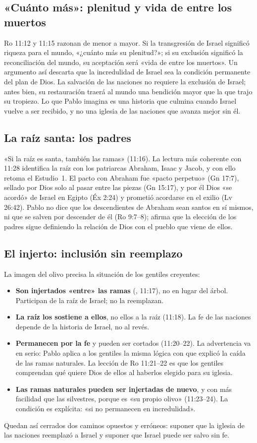 \subsection{«Cuánto más»: plenitud y vida de entre los muertos}
Ro 11:12 y 11:15 razonan de menor a mayor. Si la transgresión de Israel significó riqueza para el mundo, «¿cuánto más su plenitud?»; si su exclusión significó la reconciliación del mundo, su aceptación será «vida de entre los muertos». Un argumento así descarta que la incredulidad de Israel sea la condición permanente del plan de Dios. La salvación de las naciones no requiere la exclusión de Israel; antes bien, su restauración traerá al mundo una bendición mayor que la que trajo su tropiezo. Lo que Pablo imagina es una historia que culmina cuando Israel vuelve a ser recibido, y no una iglesia de las naciones que avanza mejor sin él.

\subsection{La raíz santa: los padres}
«Si la raíz es santa, también las ramas» (11:16). La lectura más coherente con 11:28 identifica la raíz con los patriarcas Abraham, Isaac y Jacob, y con ello retoma el Estudio~1. El pacto con Abraham fue «pacto perpetuo» (Gn 17:7), sellado por Dios solo al pasar entre las piezas (Gn 15:17), y por él Dios «se acordó» de Israel en Egipto (Éx 2:24) y prometió acordarse en el exilio (Lv 26:42). Pablo no dice que los descendientes de Abraham sean santos en sí mismos, ni que se salven por descender de él (Ro 9:7--8); afirma que la elección de los padres sigue definiendo la relación de Dios con el pueblo que viene de ellos.

\subsection{El injerto: inclusión sin reemplazo}
La imagen del olivo precisa la situación de los gentiles creyentes:
\begin{itemize}
\item \textbf{Son injertados «entre» las ramas} (, 11:17), no en lugar del árbol. Participan de la raíz de Israel; no la reemplazan.
\item \textbf{La raíz los sostiene a ellos}, no ellos a la raíz (11:18). La fe de las naciones depende de la historia de Israel, no al revés.
\item \textbf{Permanecen por la fe} y pueden ser cortados (11:20--22). La advertencia va en serio: Pablo aplica a los gentiles la misma lógica con que explicó la caída de las ramas naturales. La lección de Ro 11:21--22 es que los gentiles comprendan qué quiere Dios de ellos al haberlos elegido para su iglesia.
\item \textbf{Las ramas naturales pueden ser injertadas de nuevo}, y con más facilidad que las silvestres, porque es «su propio olivo» (11:23--24). La condición es explícita: «si no permanecen en incredulidad».
\end{itemize}
Quedan así cerrados dos caminos opuestos y erróneos: suponer que la iglesia de las naciones reemplazó a Israel y suponer que Israel puede ser salvo sin fe.


